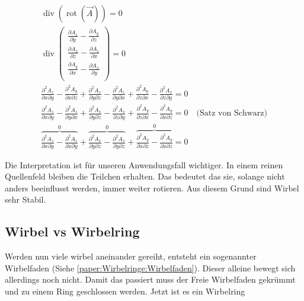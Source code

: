 \begin{gather*}
\operatorname{div} \left( \operatorname{rot} \left( \vec{A} \right) \right) 
= 0\\
\operatorname{div}      
    \begin{pmatrix} 
        \frac{\partial A_z}{\partial y} - \frac{\partial A_y}{\partial z} \\ 
        \frac{\partial A_x}{\partial z} - \frac{\partial A_z}{\partial x} \\ 
        \frac{\partial A_y}{\partial x} - \frac{\partial A_x}{\partial y} \\ 
    \end{pmatrix} 
= 0\\
\frac{\partial^2 A_z}{\partial x \partial y} - \frac{\partial^2 A_y}{\partial x \partial z} + 
\frac{\partial^2 A_x}{\partial y \partial z} - \frac{\partial^2 A_z}{\partial y \partial x} +
\frac{\partial^2 A_y}{\partial z \partial x} - \frac{\partial^2 A_x}{\partial z \partial y}
= 0\\
\frac{\partial^2 A_z}{\partial x \partial y} - \frac{\partial^2 A_z}{\partial y \partial x} + 
\frac{\partial^2 A_x}{\partial y \partial z} - \frac{\partial^2 A_x}{\partial z \partial y} +
\frac{\partial^2 A_y}{\partial z \partial x} - \frac{\partial^2 A_y}{\partial x \partial z}
= 0 \quad \text{(Satz von Schwarz)}\\
\overbrace{\frac{\partial^2 A_z}{\partial x \partial y} - \frac{\partial^2 A_z}{\partial x \partial y}}^0 + 
\overbrace{\frac{\partial^2 A_x}{\partial y \partial z} - \frac{\partial^2 A_x}{\partial y \partial z}}^0 +
\overbrace{\frac{\partial^2 A_y}{\partial x \partial z} - \frac{\partial^2 A_y}{\partial x \partial z}}^0
= 0 
\end{gather*}

Die Interpretation ist für unseren Anwendungsfall wichtiger. 
In einem reinen Quellenfeld bleiben die Teilchen erhalten. 
Das bedeutet das sie, solange nicht anders beeinflusst werden, immer weiter rotieren. 
Aus diesem Grund sind Wirbel sehr Stabil.


\subsection{Wirbel vs Wirbelring}

Werden nun viele wirbel aneinander gereiht, entsteht ein sogenannter Wirbelfaden (Siehe \ref{paper:Wirbelringe:Wirbelfaden}).
Dieser alleine bewegt sich allerdings noch nicht. 
Damit das passiert muss der Freie Wirbelfaden gekrümmt und zu einem Ring geschlossen werden. 
Jetzt ist es ein Wirbelring
